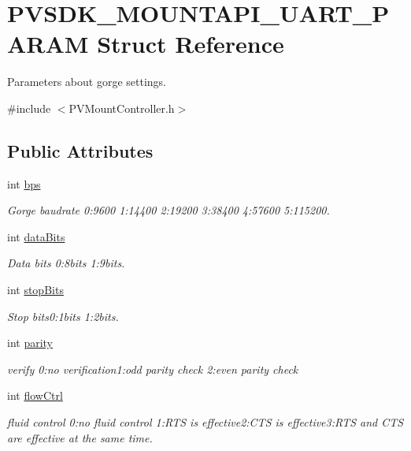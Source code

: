 \hypertarget{struct_p_v_s_d_k___m_o_u_n_t_a_p_i___u_a_r_t___p_a_r_a_m}{}\section{P\+V\+S\+D\+K\+\_\+\+M\+O\+U\+N\+T\+A\+P\+I\+\_\+\+U\+A\+R\+T\+\_\+\+P\+A\+R\+AM Struct Reference}
\label{struct_p_v_s_d_k___m_o_u_n_t_a_p_i___u_a_r_t___p_a_r_a_m}


Parameters about gorge settings.  




{\ttfamily \#include $<$P\+V\+Mount\+Controller.\+h$>$}

\subsection*{Public Attributes}
\begin{DoxyCompactItemize}
\item 
int \hyperlink{struct_p_v_s_d_k___m_o_u_n_t_a_p_i___u_a_r_t___p_a_r_a_m_a2c76998e579016e645e9d7351b215848}{bps}
\begin{DoxyCompactList}\small\item\em Gorge baudrate 0\+:9600 1\+:14400 2\+:19200 3\+:38400 4\+:57600 5\+:115200. \end{DoxyCompactList}\item 
int \hyperlink{struct_p_v_s_d_k___m_o_u_n_t_a_p_i___u_a_r_t___p_a_r_a_m_a4f993ce5de71d26d9b2575b02e913286}{data\+Bits}
\begin{DoxyCompactList}\small\item\em Data bits 0\+:8bits 1\+:9bits. \end{DoxyCompactList}\item 
int \hyperlink{struct_p_v_s_d_k___m_o_u_n_t_a_p_i___u_a_r_t___p_a_r_a_m_aaac56dc0268b74a17f2f08ccf86bd55c}{stop\+Bits}
\begin{DoxyCompactList}\small\item\em Stop bits0\+:1bits 1\+:2bits. \end{DoxyCompactList}\item 
int \hyperlink{struct_p_v_s_d_k___m_o_u_n_t_a_p_i___u_a_r_t___p_a_r_a_m_a4915a6ae4a73e8cb311e907130c48e4a}{parity}
\begin{DoxyCompactList}\small\item\em verify 0\+:no verification1\+:odd parity check 2\+:even parity check \end{DoxyCompactList}\item 
int \hyperlink{struct_p_v_s_d_k___m_o_u_n_t_a_p_i___u_a_r_t___p_a_r_a_m_a6e26d54a066b903b461281d6fc8c6c2d}{flow\+Ctrl}
\begin{DoxyCompactList}\small\item\em fluid control 0\+:no fluid control 1\+:R\+TS is effective2\+:C\+TS is effective3\+:R\+TS and C\+TS are effective at the same time. \end{DoxyCompactList}\end{DoxyCompactItemize}


